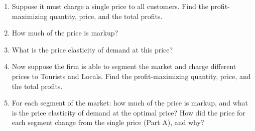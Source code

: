 \documentclass[
  11pt,
]{article}
\providecommand{\tightlist}{%
  \setlength{\itemsep}{0pt}\setlength{\parskip}{0pt}}
\begin{document}
\begin{enumerate}
\def\labelenumi{\alph{enumi}.}
\tightlist
\item
  Suppose it must charge a single price to all customers. Find the
  profit-maximizing quantity, price, and the total profits.
\item
  How much of the price is markup?
\item
  What is the price elasticity of demand at this price?
\item
  Now suppose the firm is able to segment the market and charge
  different prices to Tourists and Locals. Find the profit-maximizing
  quantity, price, and the total profits.
\item
  For each segment of the market: how much of the price is markup, and
  what is the price elasticity of demand at the optimal price? How did
  the price for each segment change from the single price (Part A), and
  why?
\end{enumerate}
\end{document}
